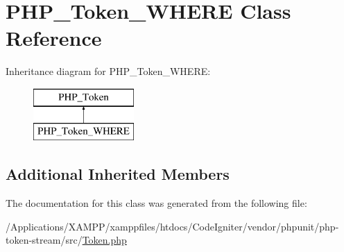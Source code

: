 \hypertarget{class_p_h_p___token___w_h_e_r_e}{}\section{P\+H\+P\+\_\+\+Token\+\_\+\+W\+H\+E\+RE Class Reference}
\label{class_p_h_p___token___w_h_e_r_e}
Inheritance diagram for P\+H\+P\+\_\+\+Token\+\_\+\+W\+H\+E\+RE\+:\begin{figure}[H]
\begin{center}
\leavevmode
\includegraphics[height=2.000000cm]{class_p_h_p___token___w_h_e_r_e}
\end{center}
\end{figure}
\subsection*{Additional Inherited Members}


The documentation for this class was generated from the following file\+:\begin{DoxyCompactItemize}
\item 
/\+Applications/\+X\+A\+M\+P\+P/xamppfiles/htdocs/\+Code\+Igniter/vendor/phpunit/php-\/token-\/stream/src/\mbox{\hyperlink{_token_8php}{Token.\+php}}\end{DoxyCompactItemize}
